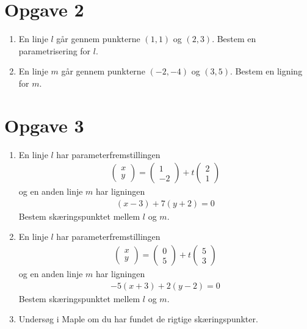 \section*{Opgave 2}
\begin{enumerate}[label=\roman*)]
	\item En linje $l$ går gennem punkterne $(1,1)$ og $(2,3)$. Bestem en parametrisering for 
	$l$. 
	\item En linje $m$ går gennem punkterne $(-2,-4)$ og $(3,5)$. Bestem en ligning for $m$.
\end{enumerate}

\section*{Opgave 3}
\begin{enumerate}[label=\roman*)]
	\item En linje $l$ har parameterfremstillingen 
	\begin{align*}
		\begin{pmatrix}
			x \\ y
		\end{pmatrix} = 
		\begin{pmatrix}
			1 \\ -2
		\end{pmatrix} + t
		\begin{pmatrix}
			2 \\ 1
		\end{pmatrix}
	\end{align*}
	og en anden linje $m$ har ligningen
	\begin{align*}
		(x-3) + 7(y+2) = 0
	\end{align*}
	Bestem skæringspunktet mellem $l$ og $m$. 
	\item En linje $l$ har parameterfremstillingen 
	\begin{align*}
		\begin{pmatrix}
			x \\ y
		\end{pmatrix} = 
		\begin{pmatrix}
			0 \\ 5
		\end{pmatrix} + t
		\begin{pmatrix}
			5 \\ 3
		\end{pmatrix}
	\end{align*}
	og en anden linje $m$ har ligningen
	\begin{align*}
		-5(x+3) + 2(y-2) = 0
	\end{align*}
	Bestem skæringspunktet mellem $l$ og $m$. 
	\item Undersøg i Maple om du har fundet de rigtige skæringspunkter.
\end{enumerate}

